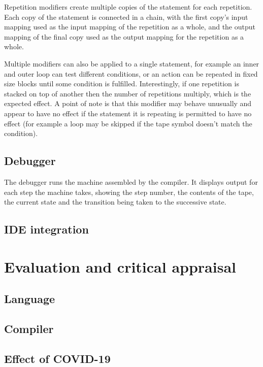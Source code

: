 \documentclass[11pt]{article}
\begin{document}
Repetition modifiers create multiple copies of the statement for each repetition. Each copy of the statement is connected in a chain, with the first copy's input mapping used as the input mapping of the repetition as a whole, and the output mapping of the final copy used as the output mapping for the repetition as a whole. 

Multiple modifiers can also be applied to a single statement, for example an inner and outer loop can test different conditions, or an action can be repeated in fixed size blocks until some condition is fulfilled. Interestingly, if one repetition is stacked on top of another then the number of repetitions multiply, which is the expected effect. A point of note is that this modifier may behave unusually and appear to have no effect if the statement it is repeating is permitted to have no effect (for example a loop may be skipped if the tape symbol doesn't match the condition).

\subsection{Debugger}

The debugger runs the machine assembled by the compiler. It displays output for each step the machine takes, showing the step number, the contents of the tape, the current state and the transition being taken to the successive state.

\subsection{IDE integration}



\section{Evaluation and critical appraisal}

\subsection{Language}

\subsection{Compiler}

\subsection{Effect of COVID-19}
\end{document}
